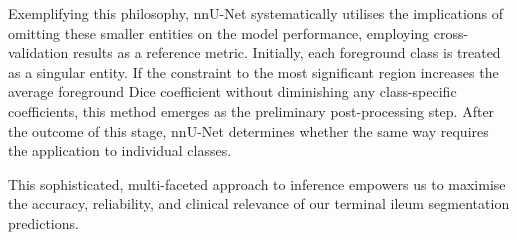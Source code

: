 Exemplifying this philosophy, nnU-Net systematically utilises the implications of omitting these smaller entities on the model performance, employing cross-validation results as a reference metric. Initially, each foreground class is treated as a singular entity. If the constraint to the most significant region increases the average foreground Dice coefficient without diminishing any class-specific coefficients, this method emerges as the preliminary post-processing step. After the outcome of this stage, nnU-Net determines whether the same way requires the application to individual classes.

This sophisticated, multi-faceted approach to inference empowers us to maximise the accuracy, reliability, and clinical relevance of our terminal ileum segmentation predictions.